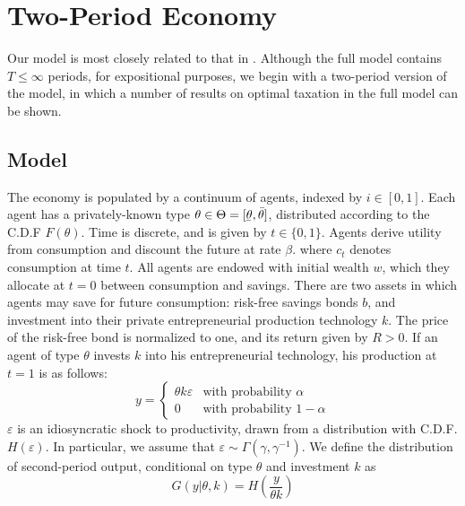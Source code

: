 \documentclass[11pt]{article}
\newcommand{\ubar}[1]{\underaccent{\bar}{#1}}
\newcommand{\inv}[1]{#1^{-1}}
\begin{document}
\section{Two-Period Economy} \label{two_pd}

Our model is most closely related to that in \cite{shourideh2014optimal}. Although the full model contains \( T\le\infty \) periods, for expositional purposes, we begin with a two-period version of the model, in which a number of results on optimal taxation in the full model can be shown. 

\subsection{Model} \label{model}

The economy is populated by a continuum of agents, indexed by \( i\in[0,1] \). Each agent has a privately-known type \( \theta\in\Theta=[\ubar{\theta},\bar{\theta}] \), distributed according to the C.D.F \( F(\theta) \). Time is discrete, and is given by \( t\in\{0,1\} \). Agents derive utility from consumption and discount the future at rate \( \beta \).
where \( c_t \) denotes consumption at time \( t \). All agents are endowed with initial wealth \( w \), which they allocate at \( t = 0 \) between consumption and savings. There are two assets in which agents may save for future consumption: risk-free savings bonds \( b \), and investment into their private entrepreneurial production technology \( k \). The price of the risk-free bond is normalized to one, and its return given by \( R > 0 \). If an agent of type \( \theta \) invests \( k \) into his entrepreneurial technology, his production at \( t = 1 \) is as follows:
\begin{equation}
    y = \begin{cases}
        \theta k \varepsilon & \text{with probability }\alpha \\
        0 & \text{with probability }1 - \alpha
    \end{cases}
\end{equation}
\( \varepsilon \) is an idiosyncratic shock to productivity, drawn from a distribution with C.D.F. \( H(\varepsilon) \). In particular, we assume that \( \varepsilon\sim\Gamma\left( \gamma,\inv{\gamma} \right) \). We define the distribution of second-period output, conditional on type \( \theta \) and investment \( k \) as 
\begin{equation}
    G\left( y|\theta,k \right) = H\left( \frac{y}{\theta k} \right)
\end{equation}
\end{document}
